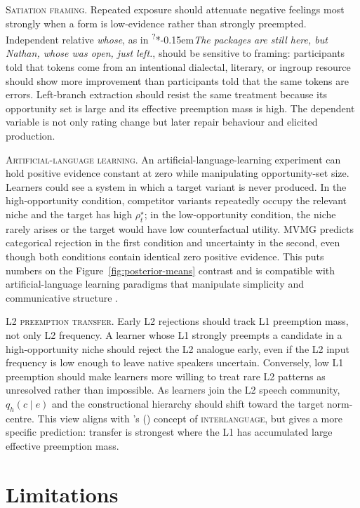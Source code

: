 \documentclass[12pt,letterpaper]{article}
\newcommand{\term}[1]{\textsc{#1}}
\newcommand{\mention}[1]{\textit{#1}}
\newcommand{\judgesep}{\kern-0.15em}
\newcommand{\ungram}[1]{*\judgesep#1}
\newcommand{\posscite}[1]{\citeauthor{#1}'s (\citeyear{#1})}
\begin{document}
\textsc{Satiation framing.}
Repeated exposure should attenuate negative feelings most strongly when a form
is low-evidence rather than strongly preempted. Independent relative
\mention{whose}, as in \textsuperscript{?}\ungram{\mention{The packages are still
here, but Nathan, whose was open, just left.}}, should be sensitive to framing:
participants told that tokens come from an intentional dialectal, literary, or
ingroup resource should show more improvement than participants told that the
same tokens are errors. Left-branch extraction should resist the same treatment
because its opportunity set is large and its effective preemption mass is high.
The dependent variable is not only rating change but later repair behaviour and
elicited production.

\textsc{Artificial-language learning.}
An artificial-language-learning experiment can hold positive evidence constant
at zero while manipulating opportunity-set size. Learners could see a system in
which a target variant is never produced. In the high-opportunity condition,
competitor variants repeatedly occupy the relevant niche and the target has high
$\rho_t^\star$; in the low-opportunity condition, the niche rarely arises or the
target would have low counterfactual utility. MVMG predicts categorical
rejection in the first condition and uncertainty in the second, even though both
conditions contain identical zero positive evidence. This puts numbers on the
Figure~\ref{fig:posterior-means} contrast and is compatible with artificial-language
learning paradigms that manipulate simplicity and communicative structure
\autocite{culbertson2016simplicity}.

\textsc{L2 preemption transfer.}
Early L2 rejections should track L1 preemption mass, not only L2 frequency. A
learner whose L1 strongly preempts a candidate in a high-opportunity niche
should reject the L2 analogue early, even if the L2 input frequency is low enough
to leave native speakers uncertain. Conversely, low L1 preemption should make
learners more willing to treat rare L2 patterns as unresolved rather than
impossible. As learners join the L2 speech community, $q_h(c\mid e)$ and the
constructional hierarchy should shift toward the target norm-centre. This view
aligns with \posscite{selinker1972} concept of \term{interlanguage}, but gives a
more specific prediction: transfer is strongest where the L1 has accumulated
large effective preemption mass.

\section{Limitations}\label{sec:limitations}
\end{document}
